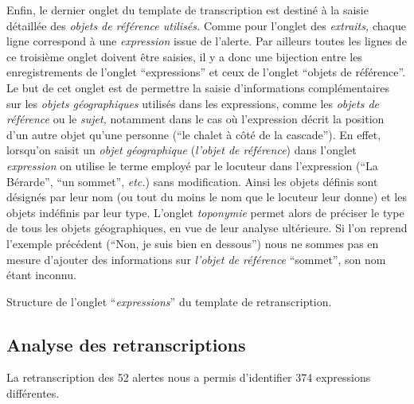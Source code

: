 Enfin, le dernier onglet du template de transcription est destiné à la
saisie détaillée des \emph{objets de référence utilisés.} Comme pour
l'onglet des \emph{extraits,} chaque ligne correspond à une
\emph{expression} issue de l'alerte. Par ailleurs toutes les lignes de
ce troisième onglet doivent être saisies, il y a donc une bijection
entre les enregistrements de l'onglet \enquote{expressions} et ceux de
l'onglet \enquote{objets de référence}. Le but de cet onglet est de
permettre la saisie d'informations complémentaires sur les
\emph{objets géographiques} utilisés dans les expressions, comme les
\emph{objets de référence} ou le \emph{sujet,} notamment dans le cas
où l'expression décrit la position d'un autre objet qu'une personne
(\eg \enquote{le chalet à côté de la cascade}). En effet, lorsqu'on
saisit un \emph{objet géographique} (\eg \emph{l'objet de référence})
dans l'onglet \emph{expression} on utilise le terme employé par le
locuteur dans l'expression (\eg \enquote{La Bérarde}, \enquote{un
  sommet}, \emph{etc.}) sans modification. Ainsi les objets définis
sont désignés par leur nom (ou tout du moins le nom que le locuteur
leur donne) et les objets indéfinis par leur type. L'onglet
\emph{toponymie} permet alors de préciser le type de tous les objets
géographiques, en vue de leur analyse ultérieure. Si l'on reprend
l'exemple précédent (\ie \enquote{Non, je suis bien en dessous}) nous
ne sommes pas en mesure d'ajouter des informations sur \emph{l'objet
  de référence} \enquote{sommet}, son nom étant inconnu.

\begin{table}
  \centering
  
  \caption{Structure de l'onglet \enquote{\emph{expressions}} du
    template de retranscription.}
  \label{tab:struct_temp}
\end{table}

\subsection{Analyse des retranscriptions}

La retranscription des 52 alertes nous a permis d'identifier 374
expressions différentes.

